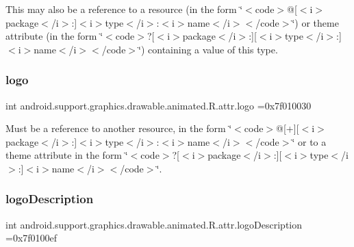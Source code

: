 This may also be a reference to a resource (in the form \char`\"{}$<$code$>$@\mbox{[}$<$i$>$package$<$/i$>$\+:\mbox{]}$<$i$>$type$<$/i$>$\+:$<$i$>$name$<$/i$>$$<$/code$>$\char`\"{}) or theme attribute (in the form \char`\"{}$<$code$>$?\mbox{[}$<$i$>$package$<$/i$>$\+:\mbox{]}\mbox{[}$<$i$>$type$<$/i$>$\+:\mbox{]}$<$i$>$name$<$/i$>$$<$/code$>$\char`\"{}) containing a value of this type. \mbox{\label{classandroid_1_1support_1_1graphics_1_1drawable_1_1animated_1_1R_1_1attr_a4f2062682a763eae64d46b8b2a2484b9}} 
\subsubsection{\texorpdfstring{logo}{logo}}
{\footnotesize\ttfamily int android.\+support.\+graphics.\+drawable.\+animated.\+R.\+attr.\+logo =0x7f010030\hspace{0.3cm}{\ttfamily [static]}}

Must be a reference to another resource, in the form \char`\"{}$<$code$>$@\mbox{[}+\mbox{]}\mbox{[}$<$i$>$package$<$/i$>$\+:\mbox{]}$<$i$>$type$<$/i$>$\+:$<$i$>$name$<$/i$>$$<$/code$>$\char`\"{} or to a theme attribute in the form \char`\"{}$<$code$>$?\mbox{[}$<$i$>$package$<$/i$>$\+:\mbox{]}\mbox{[}$<$i$>$type$<$/i$>$\+:\mbox{]}$<$i$>$name$<$/i$>$$<$/code$>$\char`\"{}. \mbox{\label{classandroid_1_1support_1_1graphics_1_1drawable_1_1animated_1_1R_1_1attr_a04288ffb7ed8c9a7db0d54e0ab79384e}} 
\subsubsection{\texorpdfstring{logo\+Description}{logoDescription}}
{\footnotesize\ttfamily int android.\+support.\+graphics.\+drawable.\+animated.\+R.\+attr.\+logo\+Description =0x7f0100ef\hspace{0.3cm}{\ttfamily [static]}}

